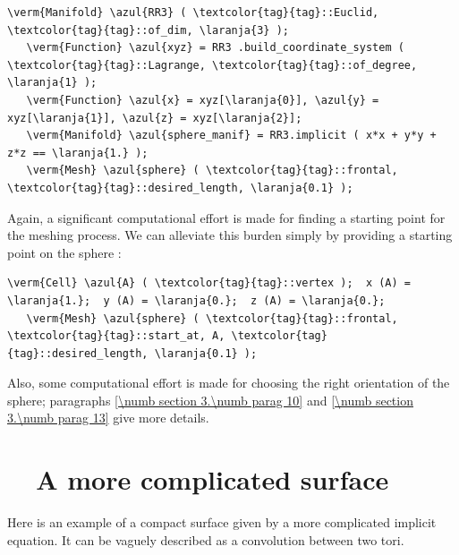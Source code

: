\begin{Verbatim}[commandchars=\\\{\},formatcom=\small\tt,frame=single,
   label=parag-\ref{\numb section 3.\numb parag 6}.cpp,rulecolor=\color{moldura},
   baselinestretch=0.94,framesep=2mm                                            ]
   \verm{Manifold} \azul{RR3} ( \textcolor{tag}{tag}::Euclid, \textcolor{tag}{tag}::of_dim, \laranja{3} );
   \verm{Function} \azul{xyz} = RR3 .build_coordinate_system ( \textcolor{tag}{tag}::Lagrange, \textcolor{tag}{tag}::of_degree, \laranja{1} );
   \verm{Function} \azul{x} = xyz[\laranja{0}], \azul{y} = xyz[\laranja{1}], \azul{z} = xyz[\laranja{2}];
   \verm{Manifold} \azul{sphere_manif} = RR3.implicit ( x*x + y*y + z*z == \laranja{1.} );
   \verm{Mesh} \azul{sphere} ( \textcolor{tag}{tag}::frontal, \textcolor{tag}{tag}::desired_length, \laranja{0.1} );
\end{Verbatim}

Again, a significant computational effort is made for finding a starting point
for the meshing process.
We can alleviate this burden simply by providing a starting point on the sphere :

\begin{Verbatim}[commandchars=\\\{\},formatcom=\small\tt,
   baselinestretch=0.94,framesep=2mm                     ]
   \verm{Cell} \azul{A} ( \textcolor{tag}{tag}::vertex );  x (A) = \laranja{1.};  y (A) = \laranja{0.};  z (A) = \laranja{0.};
   \verm{Mesh} \azul{sphere} ( \textcolor{tag}{tag}::frontal, \textcolor{tag}{tag}::start_at, A, \textcolor{tag}{tag}::desired_length, \laranja{0.1} );
\end{Verbatim}

Also, some computational effort is made for choosing the right orientation of the sphere;
paragraphs \ref{\numb section 3.\numb parag 10} and \ref{\numb section 3.\numb parag 13}
give more details.


\section{~~A more complicated surface}\label{\numb section 3.\numb parag 7}

Here is an example of a compact surface given by a more complicated implicit equation.
It can be vaguely described as a convolution between two tori.

